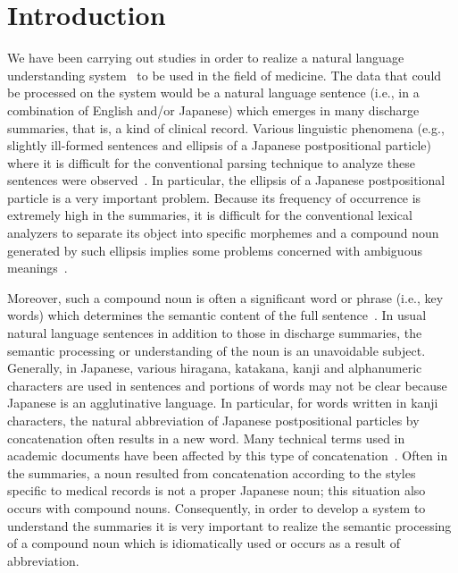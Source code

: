 \maketitle

\section{Introduction}
We have been carrying out studies in order to realize a natural
language understanding system~\cite{Yokota91b} to be used in the
field of medicine. The data that could be processed on the system
would be a natural language sentence (i.e., in a combination of
English and/or Japanese) which emerges in many discharge summaries,
that is, a kind of clinical record. Various linguistic phenomena
(e.g., slightly ill-formed sentences and ellipsis of a Japanese
postpositional particle) where it is difficult for the conventional
parsing technique to analyze these sentences were
observed~\cite{Yokota88b}. In particular, the ellipsis of a Japanese
postpositional particle is a very important problem. Because its
frequency of occurrence is extremely high in the summaries, it is
difficult for the conventional lexical analyzers to separate its
object into specific morphemes and a compound noun generated by such
ellipsis implies some problems concerned with ambiguous
meanings~\cite{Miyazaki84,Takeda87}.


Moreover, such a compound noun is often a significant word or phrase
(i.e., key words) which determines the semantic content of the full
sentence~\cite{Ishizaki90,Miyazaki84,Takeda87}. In usual natural
language sentences in addition to those in discharge summaries, the
semantic processing or understanding of the noun is an unavoidable
subject. Generally, in Japanese, various hiragana, katakana, kanji and
alphanumeric characters are used in sentences and portions of words
may not be clear because Japanese is an agglutinative language. In
particular, for words written in kanji characters, the natural
abbreviation of Japanese postpositional particles by concatenation
often results in a new word. Many technical terms used in academic
documents have been affected by this type of
concatenation~\cite{Miyazaki84}. Often in the summaries, a noun
resulted from concatenation according to the styles specific to
medical records is not a proper Japanese noun; this situation also
occurs with compound nouns. Consequently, in order to develop a system
to understand the summaries it is very important to realize the
semantic processing of a compound noun which is idiomatically used or
occurs as a result of abbreviation.


